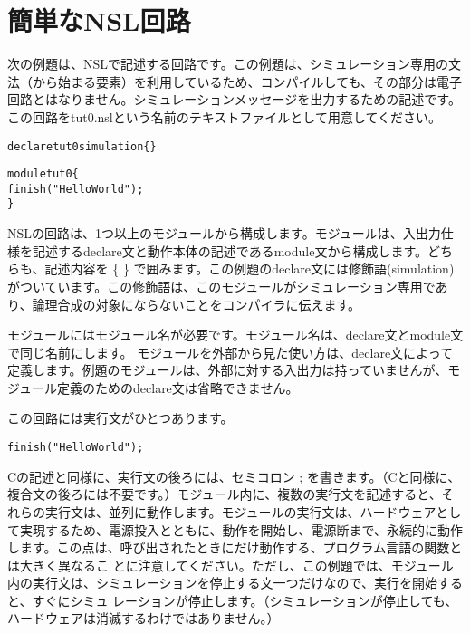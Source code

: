 \chapter{簡単なNSL回路}
\label{chap:start}

次の例題は、NSLで記述する回路です。この例題は、シミュレーション専用の文法（\textunderscore{}から始まる要素）を利用しているため、コンパイルしても、その部分は電子回路とはなりません。シミュレーションメッセージを出力するための記述です。この回路をtut0.nslという名前のテキストファイルとして用意してください。

\begin{reviewlist}
\begin{alltt}
declare tut0 simulation \{ \}

module tut0 \{
   \textunderscore{}finish("Hello World");
\}
\end{alltt}
\end{reviewlist}


NSLの回路は、1つ以上のモジュールから構成します。モジュールは、入出力仕様を記述するdeclare文と動作本体の記述であるmodule文から構成します。どちらも、記述内容を \{ \} で囲みます。この例題のdeclare文には修飾語(simulation)がついています。この修飾語は、このモジュールがシミュレーション専用であり、論理合成の対象にならないことをコンパイラに伝えます。

モジュールにはモジュール名が必要です。モジュール名は、declare文とmodule文で同じ名前にします。 モジュールを外部から見た使い方は、declare文によって定義します。例題のモジュールは、外部に対する入出力は持っていませんが、モジュール定義のためのdeclare文は省略できません。

この回路には実行文がひとつあります。

\begin{reviewemlist}
\begin{alltt}
\textunderscore{}finish("Hello World");
\end{alltt}
\end{reviewemlist}

Cの記述と同様に、実行文の後ろには、セミコロン ; を書きます。（Cと同様に、複合文の後ろには不要です。）モジュール内に、複数の実行文を記述すると、それらの実行文は、並列に動作します。モジュールの実行文は、ハードウェアとして実現するため、電源投入とともに、動作を開始し、電源断まで、永続的に動作します。この点は、呼び出されたときにだけ動作する、プログラム言語の関数とは大きく異なるこ とに注意してください。ただし、この例題では、モジュール内の実行文は、シミュレーションを停止する文一つだけなので、実行を開始すると、すぐにシミュ レーションが停止します。（シミュレーションが停止しても、ハードウェアは消滅するわけではありません。）


